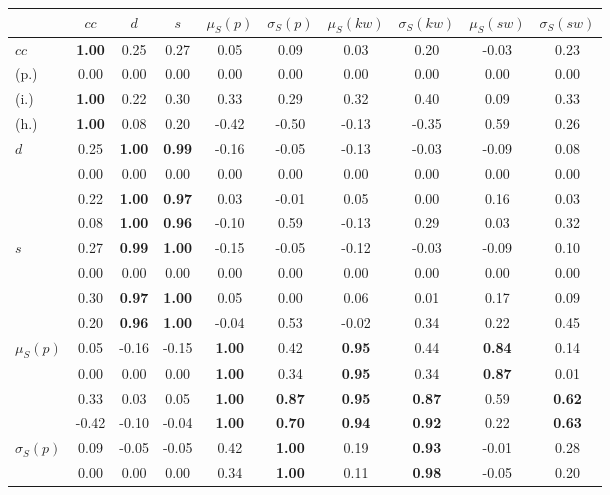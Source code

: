 \begin{table*}[h!]
\begin{center}
\begin{tabular}{| l || c | c | c | c | c | c | c | c | c |}\hline
 & $cc$ & $d$ & $s$ & $\mu_S(p)$ & $\sigma_S(p)$ & $\mu_S(kw)$ & $\sigma_S(kw)$ & $\mu_S(sw)$ & $\sigma_S(sw)$ \\\hline\hline
$cc$ & {\bf 1.00} & 0.25 & 0.27 & 0.05 & 0.09 & 0.03 & 0.20 & -0.03 & 0.23 \\
(p.) & 0.00  & 0.00  & 0.00  & 0.00  & 0.00  & 0.00  & 0.00  & 0.00  & 0.00 \\
(i.) & {\bf 1.00} & 0.22 & 0.30 & 0.33 & 0.29 & 0.32 & 0.40 & 0.09 & 0.33 \\
(h.) & {\bf 1.00} & 0.08 & 0.20 & -0.42 & -0.50 & -0.13 & -0.35 & 0.59 & 0.26 \\\hline
$d$ & 0.25 & {\bf 1.00} & {\bf 0.99} & -0.16 & -0.05 & -0.13 & -0.03 & -0.09 & 0.08 \\
 & 0.00  & 0.00  & 0.00  & 0.00  & 0.00  & 0.00  & 0.00  & 0.00  & 0.00 \\\hline
 & 0.22 & {\bf 1.00} & {\bf 0.97} & 0.03 & -0.01 & 0.05 & 0.00 & 0.16 & 0.03 \\
 & 0.08 & {\bf 1.00} & {\bf 0.96} & -0.10 & 0.59 & -0.13 & 0.29 & 0.03 & 0.32 \\\hline
$s$ & 0.27 & {\bf 0.99} & {\bf 1.00} & -0.15 & -0.05 & -0.12 & -0.03 & -0.09 & 0.10 \\
 & 0.00  & 0.00  & 0.00  & 0.00  & 0.00  & 0.00  & 0.00  & 0.00  & 0.00 \\\hline
 & 0.30 & {\bf 0.97} & {\bf 1.00} & 0.05 & 0.00 & 0.06 & 0.01 & 0.17 & 0.09 \\
 & 0.20 & {\bf 0.96} & {\bf 1.00} & -0.04 & 0.53 & -0.02 & 0.34 & 0.22 & 0.45 \\\hline
$\mu_S(p)$ & 0.05 & -0.16 & -0.15 & {\bf 1.00} & 0.42 & {\bf 0.95} & 0.44 & {\bf 0.84} & 0.14 \\
 & 0.00 & 0.00 & 0.00 & {\bf 1.00} & 0.34 & {\bf 0.95} & 0.34 & {\bf 0.87} & 0.01 \\
 & 0.33 & 0.03 & 0.05 & {\bf 1.00} & {\bf 0.87} & {\bf 0.95} & {\bf 0.87} & 0.59 & {\bf 0.62} \\
 & -0.42 & -0.10 & -0.04 & {\bf 1.00} & {\bf 0.70} & {\bf 0.94} & {\bf 0.92} & 0.22 & {\bf 0.63} \\\hline
$\sigma_S(p)$ & 0.09 & -0.05 & -0.05 & 0.42 & {\bf 1.00} & 0.19 & {\bf 0.93} & -0.01 & 0.28 \\
 & 0.00 & 0.00 & 0.00 & 0.34 & {\bf 1.00} & 0.11 & {\bf 0.98} & -0.05 & 0.20 \\

\end{tabular}
\end{center}
\end{table*}
